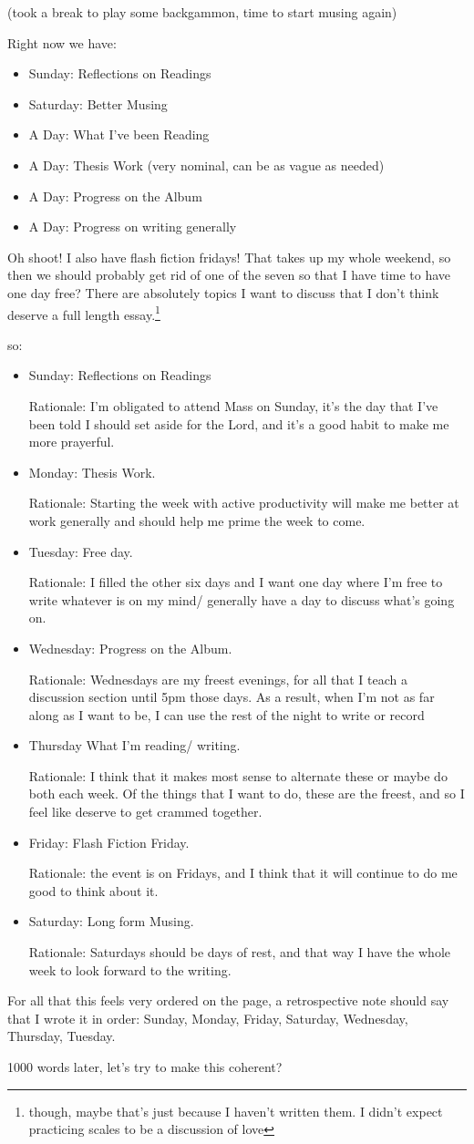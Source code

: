 \documentclass[12pt]{article}[titlepage]
\renewcommand{\,}{\textsuperscript{,}}
\begin{document}
(took a break to play some backgammon, time to start musing again)

Right now we have:
\begin{itemize}
\item Sunday: Reflections on Readings
\item Saturday: Better Musing
\item A Day: What I've been Reading
\item A Day: Thesis Work (very nominal, can be as vague as needed)
\item A Day: Progress on the Album
\item A Day: Progress on writing generally
\end{itemize}

Oh shoot! I also have flash fiction fridays! That takes up my whole weekend, so then we should probably get rid of one of the seven so that I have time to have one day free?
There are absolutely topics I want to discuss that I don't think deserve a full length essay.\footnote{though, maybe that's just because I haven't written them.
I didn't expect practicing scales to be a discussion of love}

so:
\begin{itemize}
\item Sunday: Reflections on Readings

Rationale: I'm obligated to attend Mass on Sunday, it's the day that I've been told I should set aside for the Lord, and it's a good habit to make me more prayerful.
\item Monday: Thesis Work.

Rationale: Starting the week with active productivity will make me better at work generally and should help me prime the week to come.
\item Tuesday: Free day.

Rationale: I filled the other six days and I want one day where I'm free to write whatever is on my mind/ generally have a day to discuss what's going on.
\item Wednesday: Progress on the Album.

Rationale: Wednesdays are my freest evenings, for all that I teach a discussion section until 5pm those days.
As a result, when I'm not as far along as I want to be, I can use the rest of the night to write or record
\item Thursday What I'm reading/ writing.

Rationale: I think that it makes most sense to alternate these or maybe do both each week.
Of the things that I want to do, these are the freest, and so I feel like deserve to get crammed together.
\item Friday: Flash Fiction Friday.

Rationale: the event is on Fridays, and I think that it will continue to do me good to think about it.
\item Saturday: Long form Musing.

Rationale: Saturdays should be days of rest, and that way I have the whole week to look forward to the writing.
\end{itemize}

For all that this feels very ordered on the page, a retrospective note should say that I wrote it in order: Sunday, Monday, Friday, Saturday, Wednesday, Thursday, Tuesday.

1000 words later, let's try to make this coherent?
\end{document}
